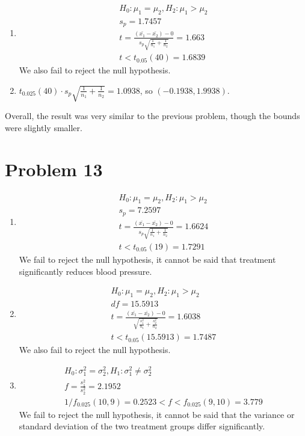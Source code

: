 \documentclass{article}
\begin{document}
\begin{enumerate}
	\item
		\begin{gather*}
			H_0: \mu_1 = \mu_2, H_2: \mu_1 > \mu_2 \\
			s_p = 1.7457 \\
			t = \frac{(\bar{x_1}-\bar{x_2}) - 0}{s_p \sqrt{\frac{1}{n_1}+\frac{1}{n_2}}}
			= 1.663 \\
			t < t_{0.05}(40) = 1.6839
		\end{gather*}
		We also fail to reject the null hypothesis.
	\item $t_{0.025}(40) \cdot s_p \sqrt{\frac{1}{n_1}+\frac{1}{n_2}}= 1.0938$, so $(-0.1938, 1.9938)$.
\end{enumerate}

Overall, the result was very similar to the previous problem, though the bounds
were slightly smaller.

\section*{Problem 13}

\begin{enumerate}
	\item
		\begin{gather*}
			H_0: \mu_1 = \mu_2, H_2: \mu_1 > \mu_2 \\
			s_p = 7.2597 \\
			t = \frac{(\bar{x_1}-\bar{x_2})-0}{s_p\sqrt{\frac{1}{n_1} + \frac{1}{n_2}}}
			= 1.6624 \\
			t < t_{0.05}(19) = 1.7291
		\end{gather*}
		We fail to reject the null hypothesis, it cannot be said that
		treatment significantly reduces blood pressure.
	\item
		\begin{gather*}
			H_0: \mu_1 = \mu_2, H_2: \mu_1 > \mu_2 \\
			df = 15.5913 \\
			t = \frac{(\bar{x_1}-\bar{x_2})-0}{\sqrt{\frac{s_1^2}{n_1} + \frac{s_2^2}{n_2}}}
			= 1.6038 \\
			t < t_{0.05}(15.5913) = 1.7487
		\end{gather*}
		We also fail to reject the null hypothesis.
	\item
		\begin{gather*}
			H_0: \sigma_1^2 = \sigma_2^2, H_1: \sigma_1^2 \ne \sigma_2^2 \\
			f = \frac{s_1^2}{s_2^2} = 2.1952 \\
			1/f_{0.025}(10, 9) = 0.2523 < f < f_{0.025}(9, 10) = 3.779
		\end{gather*}
		We fail to reject the null hypothesis, it cannot be said that
		the variance or standard deviation of the two treatment groups
		differ significantly.
\end{enumerate}
\end{document}
